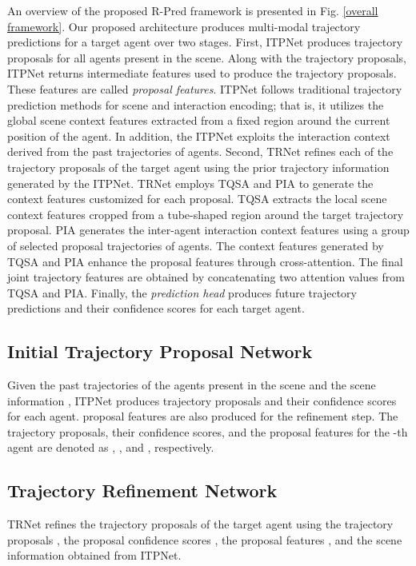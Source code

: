 \documentclass[10pt,twocolumn,letterpaper]{article}
\begin{document}
An overview of the proposed R-Pred framework is presented in Fig. \ref{overall framework}. Our proposed architecture produces  multi-modal trajectory predictions for a target agent over two stages. First, ITPNet produces  trajectory proposals for all  agents present in the scene. Along with the trajectory proposals, ITPNet returns  intermediate features used to produce the trajectory proposals. These features are called {\it proposal features}.
ITPNet follows traditional trajectory prediction methods for scene and interaction encoding; that is, it utilizes the global scene context features extracted from a fixed region around the current position of the agent. In addition, the ITPNet exploits the interaction context derived from the past trajectories of  agents. Second, TRNet refines each of the  trajectory proposals of the target agent using the prior trajectory information generated by the ITPNet.  TRNet employs TQSA and PIA to generate the  context features customized for each proposal.    TQSA extracts the local scene context features cropped from a tube-shaped region around the target trajectory proposal.  PIA generates the inter-agent interaction context features using a group of selected proposal trajectories of  agents. 
The context features generated by TQSA and PIA enhance the proposal features through cross-attention. The final joint trajectory features are obtained by concatenating two attention values from TQSA and PIA. Finally, the {\it prediction head} produces  future trajectory predictions and their confidence scores for each target agent.





\subsection{Initial Trajectory Proposal Network}

Given the past trajectories  of the  agents present in the scene and the scene information , ITPNet produces  trajectory proposals and their confidence scores for each agent.  proposal features are also produced for the refinement step. 
The trajectory proposals,  their confidence scores, and  the proposal features for the -th agent are denoted as , , and , respectively. 







\subsection{Trajectory Refinement Network }
TRNet refines the trajectory proposals  of the target agent using the trajectory proposals , the proposal confidence scores , the proposal features ,  and the scene information   obtained from ITPNet. 
\end{document}
